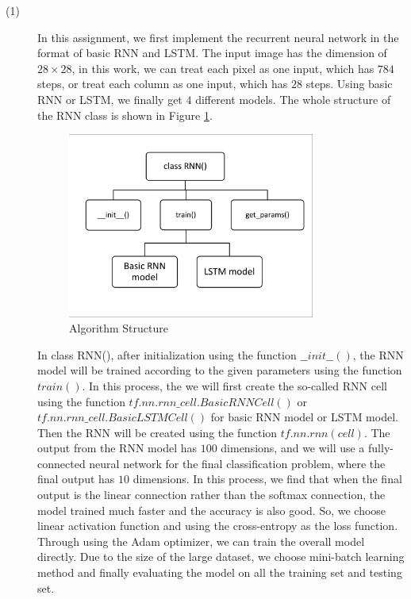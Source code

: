 \begin{description}

\item[(1) ] In this assignment, we first implement the recurrent neural network in the format of basic RNN and LSTM. The input image has the dimension of $28 \times 28$, in this work, we can treat each pixel as one input, which has $784$ steps, or treat each column as one input, which has $28$ steps. Using basic RNN or LSTM, we finally get $4$ different models. The whole structure of the RNN class is shown in Figure \ref{fig:structure}.

\begin{figure}[H]
\centering
\includegraphics[width=0.8\textwidth]{./figures/ECE544hw5.pdf}
\caption{\label{fig:structure} Algorithm Structure}
\end{figure}

In class RNN(), after initialization using the function $\_\_init\_\_()$, the RNN model will be trained according to the given parameters using the function $train()$. In this process, the we will first create the so-called RNN cell using the function $tf.nn.rnn\_cell.BasicRNNCell()$ or $tf.nn.rnn\_cell.BasicLSTMCell()$ for basic RNN model or LSTM model. Then the RNN will be created using the function $ tf.nn.rnn(cell)$. The output from the RNN model has $100$ dimensions, and we will use a fully-connected neural network for the final classification problem, where the final output has $10$ dimensions. In this process, we find that when the final output is the linear connection rather than the softmax connection, the model trained much faster and the accuracy is also good. So, we choose linear activation function and using the cross-entropy as the loss function. Through using the Adam optimizer, we can train the overall model directly. Due to the size of the large dataset, we choose mini-batch learning method and finally evaluating the model on all the training set and testing set. \\


\end{description}
